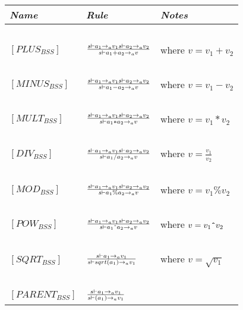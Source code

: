 \begin{table}[h]
	\begin{tabular}{|l|l|l|}
	\hline
	\emph{Name}			& \emph{Rule}																															& \emph{Notes} \\ \hline
			~			&															~																			& ~ \\
	$[PLUS_{BSS}]$		& $s \vdash a_{1} \rightarrow_{a} v_{1}  s \vdash a_{2} \rightarrow_{a} v_{2} \over s \vdash a_{1}+a_{2} \rightarrow_{a} v$ 			& where $v = v_{1}+v_{2}$ \\
			~			&															~																			& ~ \\
	$[MINUS_{BSS}]$		& $s \vdash a_{1} \rightarrow_{a} v_{1}  s \vdash a_{2} \rightarrow_{a} v_{2} \over s \vdash a_{1}-a_{2} \rightarrow_{a} v$ 			& where $v = v_{1}-v_{2}$ \\
			~			&															~																			& ~ \\
	$[MULT_{BSS}]$		& $s \vdash a_{1} \rightarrow_{a} v_{1}  s \vdash a_{2} \rightarrow_{a} v_{2} \over s \vdash a_{1}*a_{2} \rightarrow_{a} v$ 			& where $v = v_{1}*v_{2}$ \\
			~			&															~																			& ~ \\
	$[DIV_{BSS}]$		& $s \vdash a_{1} \rightarrow_{a} v_{1}  s \vdash a_{2} \rightarrow_{a} v_{2} \over s \vdash {a_{1}}/{a_{2}} \rightarrow_{a} v$ 		& where $v = \frac{v_{1}}{v_{2}}$ \\
			~			&																																		& ~ \\
	$[MOD_{BSS}]$		& $s \vdash a_{1} \rightarrow_{a} v_{1}  s \vdash a_{2} \rightarrow_{a} v_{2} \over s \vdash a_{1}\%a_{2} \rightarrow_{a} v$			& where $v = v_{1}\%v_{2}$ \\
			~			&															~																			& ~ \\
	$[POW_{BSS}]$		& $s \vdash a_{1} \rightarrow_{a} v_{1}  s \vdash a_{2} \rightarrow_{a} v_{2} \over s \vdash a_{1}\texttt{\^{}}a_{2} \rightarrow_{a} v$	& where $v = v_{1}\texttt{\^{}}v_{2}$ \\
			~			&															~																			& ~ \\
	$[SQRT_{BSS}]$		& $s \vdash a_{1} \rightarrow_{a} v_{1} \over s \vdash sqrt(a_{1}) \rightarrow_{a} v_{1}$												& where $v = \sqrt{v_{1}}$ \\
			~			&															~																			& ~ \\
	$[PARENT_{BSS}]$	& $s \vdash a_{1} \rightarrow_{a} v_{1} \over s \vdash (a_{1}) \rightarrow_{a} v_{1}$													& ~ \\

\end{tabular}
\end{table}
